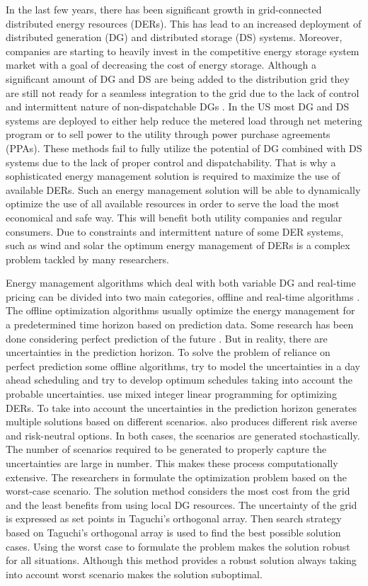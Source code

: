 In the last few years, there has been significant growth in grid-connected distributed energy resources (DERs). This has lead to an increased deployment of distributed generation (DG) and distributed storage (DS) systems. Moreover, companies are starting to heavily invest in the competitive energy storage system market with a goal of decreasing the cost of energy storage. Although a significant amount of DG and DS are being added to the distribution grid they are still not ready for a seamless integration to the grid due to the lack of control and intermittent nature of non-dispatchable DGs \cite{denholm2016path}. In the US most DG and DS systems are deployed to either help reduce the metered load through net metering program or to sell power to the utility through power purchase agreements (PPAs). These methods fail to fully utilize the potential of DG combined with DS systems due to the lack of proper control and dispatchability. That is why a sophisticated energy management solution is required to maximize the use of available DERs. Such an energy management solution will be able to dynamically optimize the use of all available resources in order to serve the load the most economical and safe way. This will benefit both utility companies and regular consumers. Due to constraints and intermittent nature of some DER systems, such as wind and solar the optimum energy management of DERs is a complex problem tackled by many researchers.

Energy management algorithms which deal with both variable DG and real-time pricing can be divided into two main categories, offline and real-time algorithms \cite{rt_shi_2017}. The offline optimization algorithms usually optimize the energy management for a predetermined time horizon based on prediction data. Some research has been done considering perfect prediction of the future \cite{Off_1,off_2,off_3,off_4}. But in reality, there are uncertainties in the prediction horizon. To solve the problem of reliance on perfect prediction some offline algorithms, try to model the uncertainties in a day ahead scheduling and try to develop optimum schedules taking into account the probable uncertainties. \cite{ous_1,ous_2} use mixed integer linear programming for optimizing DERs. To take into account the uncertainties in the prediction horizon \cite{ous_2} generates multiple solutions based on different scenarios. \cite{ous_1} also produces different risk averse and risk-neutral options. In both cases, the scenarios are generated stochastically. The number of scenarios required to be generated to properly capture the uncertainties are large in number. This makes these process computationally extensive. The researchers in \cite{ous_3} formulate the optimization problem based on the worst-case scenario. The solution method considers the most cost from the grid and the least benefits from using local DG resources. The uncertainty of the grid is expressed as set points in Taguchi’s orthogonal array. Then search strategy based on Taguchi’s orthogonal array is used to find the best possible solution cases. Using the worst case to formulate the problem makes the solution robust for all situations. Although this method provides a robust solution always taking into account worst scenario makes the solution suboptimal. 

